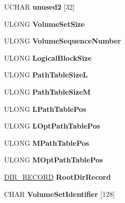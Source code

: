 \begin{DoxyCompactItemize}
U\+C\+H\+AR {\bfseries unused2} \mbox{[}32\mbox{]}
\item 
\mbox{\label{struct___p_v_d_a711f6f0d56b6158506353cd47028e055}} 
U\+L\+O\+NG {\bfseries Volume\+Set\+Size}
\item 
\mbox{\label{struct___p_v_d_a30f23d131a7dca4a383b543a19dc6845}} 
U\+L\+O\+NG {\bfseries Volume\+Sequence\+Number}
\item 
\mbox{\label{struct___p_v_d_a5a657766d660becfc89747f8d1fa3ba7}} 
U\+L\+O\+NG {\bfseries Logical\+Block\+Size}
\item 
\mbox{\label{struct___p_v_d_acd9011e75445a813dc916f26e96ea1d8}} 
U\+L\+O\+NG {\bfseries Path\+Table\+SizeL}
\item 
\mbox{\label{struct___p_v_d_a2423d163b0873282f1b7db66739646af}} 
U\+L\+O\+NG {\bfseries Path\+Table\+SizeM}
\item 
\mbox{\label{struct___p_v_d_a08f287890e3572f4017c19528676cb7a}} 
U\+L\+O\+NG {\bfseries L\+Path\+Table\+Pos}
\item 
\mbox{\label{struct___p_v_d_a34ba1c5c8c1bad10d131b4710c575912}} 
U\+L\+O\+NG {\bfseries L\+Opt\+Path\+Table\+Pos}
\item 
\mbox{\label{struct___p_v_d_ac606fc2370e870c0bf6c59d4414bafda}} 
U\+L\+O\+NG {\bfseries M\+Path\+Table\+Pos}
\item 
\mbox{\label{struct___p_v_d_a5e21ef48b5093a832191c43fd282b486}} 
U\+L\+O\+NG {\bfseries M\+Opt\+Path\+Table\+Pos}
\item 
\mbox{\label{struct___p_v_d_a0ec0280037182e3244db2069a05c3bbe}} 
\hyperlink{struct___d_i_r___r_e_c_o_r_d}{D\+I\+R\+\_\+\+R\+E\+C\+O\+RD} {\bfseries Root\+Dir\+Record}
\item 
\mbox{\label{struct___p_v_d_a57cdab0fe417b112bd9909812ea9d076}} 
C\+H\+AR {\bfseries Volume\+Set\+Identifier} \mbox{[}128\mbox{]}
\item 
\mbox{\label{struct___p_v_d_a6b84bddd8ef5b88d2c121a3cbc6888d0}} 

\end{DoxyCompactItemize}

